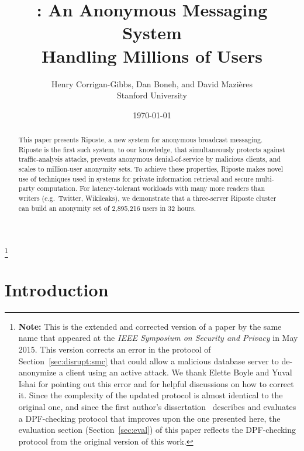 \documentclass[10pt,twocolumn]{article}
\title{\Large \bf \Name: An Anonymous Messaging System\\Handling Millions of Users}
\author{Henry Corrigan-Gibbs, Dan Boneh, and David Mazi\`eres\\
Stanford University}
\date{\today}
\newcommand\blfootnote[1]{\begingroup
  \renewcommand\thefootnote{}\footnote{#1}\addtocounter{footnote}{-1}\endgroup
}
\newcommand{\name}{Riposte\xspace}
\newcommand{\Name}{Riposte\xspace}
\begin{document}
\maketitle

\begin{abstract}
This paper presents \name, a new system for anonymous
broadcast messaging.
\Name is the first such system, to our knowledge, that
simultaneously protects against traffic-analysis attacks,
prevents anonymous denial-of-service by malicious clients,
and scales to million-user anonymity sets.
To achieve these properties, \name makes novel use
of techniques used in systems for private information retrieval and
secure multi-party computation. 
For latency-tolerant workloads with many more readers than writers 
(e.g.~Twitter, Wikileaks), we demonstrate that
a three-server \name cluster can build an anonymity set of 2,895,216 users
in 32 hours.
\end{abstract}

\blfootnote{{\color{blue} \textbf{Note:}} 
This is the extended and corrected
version of a paper by the same name that appeared at the
{\em IEEE Symposium on Security and Privacy}
in May 2015. This version corrects an error in the 
 protocol of Section~\ref{sec:disrupt:smc}
that could allow a malicious database server to de-anonymize
a client using an active attack.
We thank Elette Boyle and Yuval Ishai for pointing out this
error and for helpful discussions on how to correct it.
Since the complexity of the updated protocol is almost identical
to the original one, and since the first author's 
dissertation~\cite{thesis} describes and evaluates
a DPF-checking protocol that improves upon the one
presented here, the evaluation section (Section~\ref{sec:eval}) 
of this paper reflects the DPF-checking protocol from
the original version of this work.
}

 
\section{Introduction}
\end{document}
